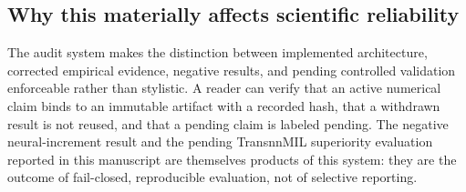 \subsection{Why this materially affects scientific reliability}

The audit system makes the distinction between implemented architecture,
corrected empirical evidence, negative results, and pending controlled
validation enforceable rather than stylistic. A reader can verify that an active
numerical claim binds to an immutable artifact with a recorded hash, that a
withdrawn result is not reused, and that a pending claim is labeled pending. The
negative neural-increment result and the pending TransnnMIL superiority
evaluation reported in this manuscript are themselves products of this system:
they are the outcome of fail-closed, reproducible evaluation, not of selective
reporting.
